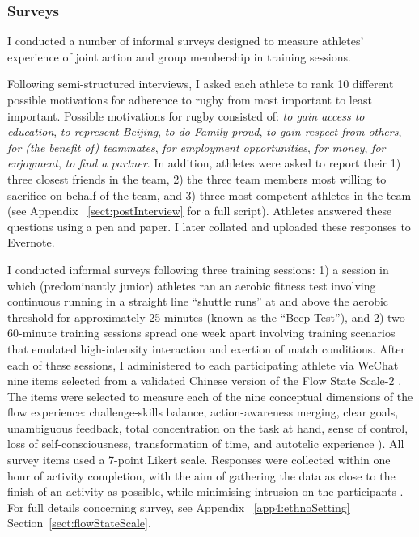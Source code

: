 \begin{CJK}{UTF8}{gbsn}

\subsubsection{Surveys\label{sect:procSurveys}}

 I conducted a number of informal surveys designed to measure athletes' experience of joint action and group membership in training sessions.

   Following semi-structured interviews, I asked each athlete to rank 10 different possible motivations for adherence to rugby from most important to least important. Possible motivations for rugby consisted of: \textit{to gain access to education}, \textit{to represent Beijing}, \textit{to do Family proud}, \textit{to gain respect from others}, \textit{for (the benefit of) teammates}, \textit{for employment opportunities}, \textit{for money}, \textit{for enjoyment}, \textit{to find a partner}. In addition, athletes were asked to report their 1) three closest friends in the team, 2) the three team members most willing to sacrifice on behalf of the team, and 3) three most competent athletes in the team (see Appendix ~\ref{sect:postInterview} for a full script). Athletes answered these questions using a pen and paper. I later collated and uploaded these responses to Evernote.

    I conducted informal surveys following three training sessions: 1) a session in which (predominantly junior) athletes ran an aerobic fitness test involving continuous running in a straight line ``shuttle runs''  at and above the aerobic threshold for approximately 25 minutes (known as the ``Beep Test''), and 2) two 60-minute training sessions spread one week apart involving training scenarios that emulated high-intensity interaction and exertion of match conditions.  After each of these sessions, I administered to each participating athlete via WeChat nine items selected from a validated Chinese version \citep{Liu2012} of the Flow State Scale-2 \citep{Jackson2002}.  The items were selected to measure each of the nine conceptual dimensions of the flow experience: challenge-skills balance, action-awareness merging, clear goals, unambiguous feedback, total concentration on the task at hand, sense of control, loss of self-consciousness, transformation of time, and autotelic experience \citep{Csikszentmihalyi1990}).  All survey items used a 7-point Likert scale.  Responses were collected within one hour of activity completion, with the aim of gathering the data as close to the finish of an activity as possible, while minimising intrusion on the participants \citep{Jackson2004}. For full details concerning survey, see Appendix ~\ref{app4:ethnoSetting} Section~\ref{sect:flowStateScale}.



\end{CJK}
